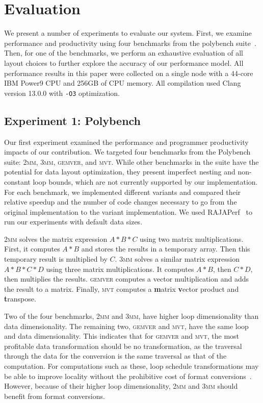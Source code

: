 \documentclass[sigconf,review=true]{acmart}
\begin{document}
\section{Evaluation}
\label{sec:eval}
We present a number of experiments to evaluate our system. 
First, we examine performance and productivity using four benchmarks from the polybench suite~\cite{pouchet2012polybench}.
Then, for one of the benchmarks, we perform an exhaustive evaluation of all layout choices to further explore the accuracy of our performance model.
All performance results in this paper were collected on a single node with a 44-core IBM Power9 CPU and 256GB of CPU memory.
All compilation used Clang version 13.0.0 with \verb.-O3. optimization.

\subsection{Experiment 1: Polybench}

Our first experiment examined the performance and programmer productivity impacts of our contribution.
We targeted four benchmarks from the Polybench suite: \textsc{2mm}, \textsc{3mm}, \textsc{gemver}, and \textsc{mvt}.
While other benchmarks in the suite have the potential for data layout optimization, they present imperfect nesting and non-constant loop bounds, which are not currently supported by our implementation. 
For each benchmark, we implemented different variants and compared their relative speedup and the number of code changes necessary to go from the original implementation to the variant implementation.
We used RAJAPerf~\cite{hornung2017raja} to run our experiments with default data sizes.

\textsc{2mm} solves the matrix expression $A*B*C$ using two matrix multiplications. 
First, it computes $A*B$ and stores the results in a temporary array.
Then this temporary result is multiplied by $C$.
\textsc{3mm} solves a similar matrix expression $A*B*C*D$ using three matrix multiplications.
It computes $A*B$, then $C*D$, then multiplies the results.
\textsc{gemver} computes a vector multiplication and adds the result to a matrix. 
Finally, \textsc{mvt} computes a \textbf{m}atrix \textbf{v}ector product and \textbf{t}ranspose.

Two of the four benchmarks, \textsc{2mm} and \textsc{3mm}, have higher loop dimensionality than data dimensionality. 
The remaining two, \textsc{gemver} and \textsc{mvt}, have the same loop and data dimensionality. 
This indicates that for \textsc{gemver} and \textsc{mvt}, the most profitable data transformation should be no transformation, as the traversal through the data for the conversion is the same traversal as that of the computation.
For computations such as these, loop schedule transformations may be able to improve locality without the prohibitive cost of format conversions~\cite{kandemir1998improving}.
However, because of their higher loop dimensionality, \textsc{2mm} and \textsc{3mm} should benefit from format conversions.
\end{document}
